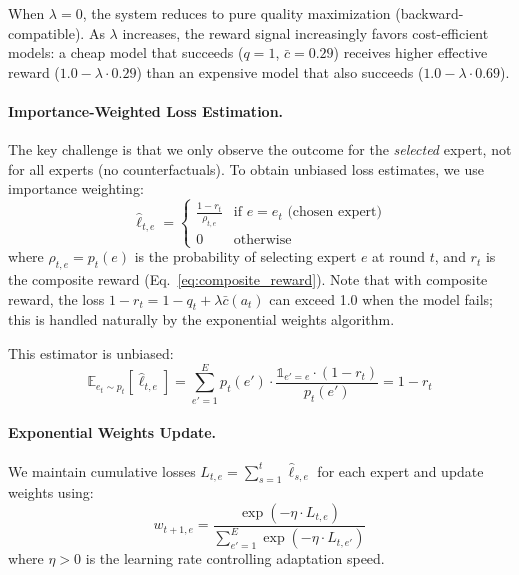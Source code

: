 When $\lambda = 0$, the system reduces to pure quality maximization (backward-compatible).
As $\lambda$ increases, the reward signal increasingly favors cost-efficient models:
a cheap model that succeeds ($q=1$, $\bar{c}=0.29$) receives higher effective reward ($1.0 - \lambda \cdot 0.29$) than an expensive model that also succeeds ($1.0 - \lambda \cdot 0.69$).

\paragraph{Importance-Weighted Loss Estimation.}
The key challenge is that we only observe the outcome for the \emph{selected} expert, not for all experts (no counterfactuals).
To obtain unbiased loss estimates, we use importance weighting:
\begin{equation}
\hat{\ell}_{t,e} = \begin{cases}
\frac{1 - r_t}{\rho_{t,e}} & \text{if } e = e_t \text{ (chosen expert)} \\
0 & \text{otherwise}
\end{cases}
\label{eq:importance_weighted_loss}
\end{equation}
where $\rho_{t,e} = p_t(e)$ is the probability of selecting expert $e$ at round $t$, and $r_t$ is the composite reward (Eq.~\ref{eq:composite_reward}).
Note that with composite reward, the loss $1 - r_t = 1 - q_t + \lambda \bar{c}(a_t)$ can exceed 1.0 when the model fails; this is handled naturally by the exponential weights algorithm.

This estimator is unbiased:
\begin{equation}
\mathbb{E}_{e_t \sim p_t}[\hat{\ell}_{t,e}] 
= \sum_{e'=1}^{E} p_t(e') \cdot \frac{\mathbb{1}_{e'=e} \cdot (1-r_t)}{p_t(e')} 
= 1 - r_t
\end{equation}

\paragraph{Exponential Weights Update.}
We maintain cumulative losses $L_{t,e} = \sum_{s=1}^{t} \hat{\ell}_{s,e}$ for each expert and update weights using:
\begin{equation}
w_{t+1,e} = \frac{\exp(-\eta \cdot L_{t,e})}{\sum_{e'=1}^{E} \exp(-\eta \cdot L_{t,e'})}
\label{eq:exponential_weights}
\end{equation}
where $\eta > 0$ is the learning rate controlling adaptation speed.

